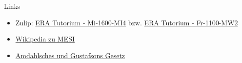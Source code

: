 \documentclass[
  german,            %
  aspectratio=169,    %
]{tumbeamer}
\begin{document}
\begin{frame}[fragile, c]{Links}{}
  \begin{itemize}
    \item Zulip: \href{https://zulip.in.tum.de/#narrow/stream/1917-ERA-Tutorium---Mi-1600-MI4}{\glqq ERA Tutorium - Mi-1600-MI4\grqq}
          bzw. \href{https://zulip.in.tum.de/#narrow/stream/1940-ERA-Tutorium---Fr-1100-MW2}{\glqq ERA Tutorium - Fr-1100-MW2\grqq}
    \item \href{https://de.wikipedia.org/wiki/MESI}{Wikipedia zu MESI}
    \item \href{https://www.educative.io/answers/difference-between-amdahls-and-gustafsons-laws}{Amdahlsches und Gustafsons Gesetz}
  \end{itemize}
\end{frame}

\maketitle
\end{document}
